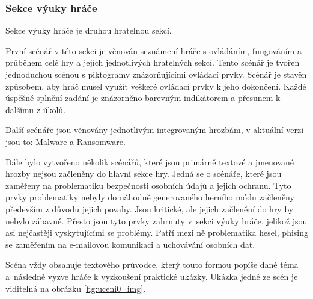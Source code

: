 \subsubsection{Sekce výuky hráče}
\label{sec:vyuka_scenar}

Sekce výuky hráče je druhou hratelnou sekcí.

První scénář v této sekci je věnován seznámení hráče s ovládáním, fungováním a průběhem celé hry a jejích jednotlivých hratelných sekcí. Tento scénář je tvořen jednoduchou scénou s piktogramy znázorňujícími ovládací prvky. Scénář je stavěn způsobem, aby hráč musel využít veškeré ovládací prvky k jeho dokončení. Každé úspěšné splnění zadání je znázorněno barevným indikátorem a přesunem k dalšímu z úkolů.

Další scénáře jsou věnovány jednotlivým integrovaným hrozbám, v aktuální verzi jsou to: Malware a Ransomware.

Dále bylo vytvořeno několik scénářů, které jsou primárně textové a jmenované hrozby nejsou začleněny do hlavní sekce hry. Jedná se o scénáře, které jsou zaměřeny na problematiku bezpečnosti osobních údajů a jejich ochranu. Tyto prvky problematiky nebyly do náhodně generovaného herního módu začleněny především z důvodu jejich povahy. Jsou kritické, ale jejich začlenění do hry by nebylo zábavné. Přesto jsou tyto prvky zahrnuty v~sekci výuky hráče, jelikož jsou asi nejčastěji vyskytujícími se problémy. Patří mezi ně problematika hesel, phising se zaměřením na e-mailovou komunikaci a uchovávání osobních dat.

Scéna vždy obsahuje textového průvodce, který touto formou popíše dané téma a~následně vyzve hráče k vyzkoušení praktické ukázky. Ukázka jedné ze scén je viditelná na obrázku \ref{fig:uceni0_img}.
